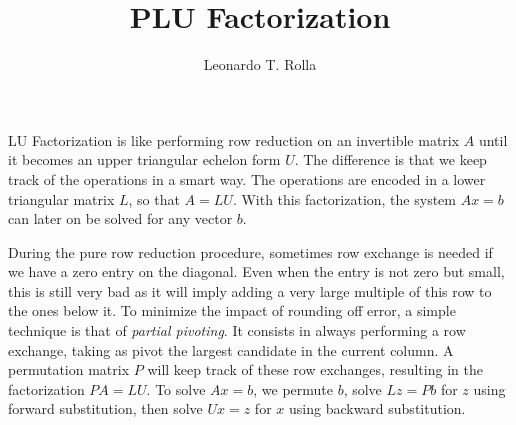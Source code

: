 \documentclass[11pt]{article}
\newcommand{\1}{\mathbf{1}}
\newcommand{\0}{\mathbf{0}}
\begin{document}
\title{PLU Factorization}
\author{Leonardo T. Rolla}
\maketitle

{\let\thefootnote\relax
{}}


LU Factorization is like performing row reduction on an invertible matrix $A$ until it becomes an upper triangular echelon form $U$.
The difference is that we keep track of the operations in a smart way.
The operations are encoded in a lower triangular matrix $L$, so that $A=LU$.
With this factorization, the system $Ax=b$ can later on be solved for any vector $b$.

During the pure row reduction procedure, sometimes row exchange is needed if we have a zero entry on the diagonal.
Even when the entry is not zero but small, this is still very bad as it will imply adding a very large multiple of this row to the ones below it.
To minimize the impact of rounding off error, a simple technique is that of \emph{partial pivoting}.
It consists in always performing a row exchange, taking as pivot the largest candidate in the current column.
A permutation matrix $P$ will keep track of these row exchanges, resulting in the factorization $PA = LU$.
To solve $Ax=b$, we permute $b$, solve $Lz=Pb$ for $z$ using forward substitution, then solve $Ux=z$ for $x$ using backward substitution.
\end{document}
